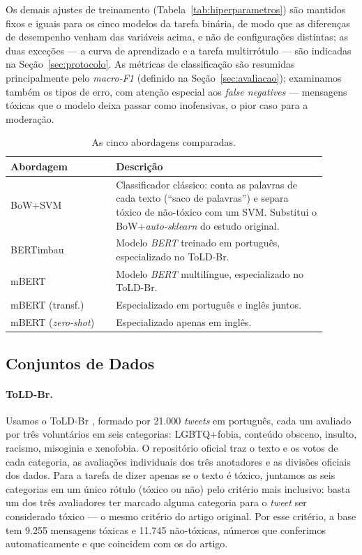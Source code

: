 \documentclass[sigconf, nonacm]{acmart}
\begin{document}
Os demais ajustes de treinamento (Tabela~\ref{tab:hiperparametros}) são
mantidos fixos e iguais para os cinco modelos da tarefa binária, de modo
que as diferenças de desempenho venham das variáveis acima, e não de
configurações distintas; as duas exceções --- a curva de aprendizado e a
tarefa multirrótulo --- são indicadas na Seção~\ref{sec:protocolo}. As
métricas de classificação são resumidas principalmente pelo
\emph{macro-F1} (definido na Seção~\ref{sec:avaliacao}); examinamos também
os tipos de erro, com atenção especial aos \emph{false negatives} ---
mensagens tóxicas que o modelo deixa passar como inofensivas, o pior caso
para a moderação.
 
\begin{table}[t]
  \caption{As cinco abordagens comparadas.}
  \label{tab:modelos}
  \small
  \begin{tabular}{@{}p{0.30\linewidth}p{0.60\linewidth}@{}}
    \toprule
    \textbf{Abordagem} & \textbf{Descrição} \\
    \midrule
    BoW+SVM & Classificador clássico: conta as palavras de cada texto (``saco de palavras'') e separa tóxico de não-tóxico com um SVM. Substitui o BoW+\emph{auto-sklearn} do estudo original. \\
    BERTimbau & Modelo \emph{BERT} treinado em português, especializado no ToLD-Br. \\
    mBERT & Modelo \emph{BERT} multilíngue, especializado no ToLD-Br. \\
    mBERT (transf.) & Especializado em português e inglês juntos. \\
    mBERT (\emph{zero-shot}) & Especializado apenas em inglês. \\
    \bottomrule
  \end{tabular}
\end{table}
 
\subsection{Conjuntos de Dados}
\label{sec:dados}
 
\paragraph{ToLD-Br.} Usamos o ToLD-Br \cite{leite2020toxic}, formado por
21.000 \emph{tweets} em português, cada um avaliado por três voluntários em
seis categorias: LGBTQ+fobia, conteúdo obsceno, insulto, racismo, misoginia
e xenofobia. O repositório oficial traz o texto e os votos de cada
categoria, as avaliações individuais dos três anotadores e as divisões
oficiais dos dados. Para a tarefa de dizer apenas se o texto é tóxico,
juntamos as seis categorias em um único rótulo (tóxico ou não) pelo
critério mais inclusivo: basta um dos três avaliadores ter marcado alguma
categoria para o \emph{tweet} ser considerado tóxico --- o mesmo critério
do artigo original. Por esse critério, a base tem 9.255 mensagens tóxicas e
11.745 não-tóxicas, números que conferimos automaticamente e que coincidem
com os do artigo.
 
\end{document}

